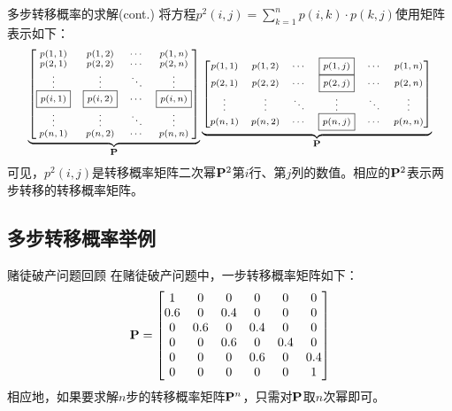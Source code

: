 \documentclass[t]{beamer}
\begin{document}
\begin{frame}{多步转移概率的求解(cont.)}
    将方程$p^2(i,j)=\displaystyle\sum_{k=1}^{n} p(i,k)\cdot p(k,j)$使用矩阵表示如下：
    \begin{equation*}\scriptsize
    \underbrace{\begin{bmatrix}
        p(1,1)&p(1,2)&\cdots &p(1,n)\\
        p(2,1)&p(2,2)&\cdots &p(2,n)\\
        \vdots&\vdots&\ddots&\vdots\\
        \boxed{p(i,1)}& \boxed{p(i,2)}&\cdots &\boxed{p(i,n)}\\
        \vdots&\vdots&\ddots&\vdots\\
        p(n,1)& p(n,2)&\cdots &p(n,n)\\
        \end{bmatrix}}_{\bf P}\underbrace{\begin{bmatrix}
        p(1,1)&p(1,2)&\cdots &\boxed{ p(1,j)}&\cdots&p(1,n)\\
        p(2,1)&p(2,2)&\cdots &\boxed{ p(2,j)}&\cdots&p(2,n)\\
        \vdots&\vdots& \ddots&\vdots&\ddots&\vdots\\
        p(n,1)&p(n,2)&\cdots &\boxed{ p(n,j)}&\cdots&p(n,n)\\
        \end{bmatrix}}_{\bf P} 
    \end{equation*}
        可见，$p^2(i,j)$是转移概率矩阵二次幂${\bf P}^2$第$i$行、第$j$列的数值。相应的${\bf P}^2$表示两步转移的转移概率矩阵。
\end{frame}

\subsection{多步转移概率举例}
\begin{frame}{赌徒破产问题回顾}
    在赌徒破产问题中，一步转移概率矩阵如下：
    \begin{equation*}
    {\bf P}=\begin{bmatrix}
     1 & 0 & 0 & 0 & 0 & 0\\
     0.6 & 0 & 0.4 & 0 & 0 & 0\\
     0 & 0.6 & 0 & 0.4 & 0 & 0\\
     0 & 0 & 0.6 & 0 & 0.4 & 0\\
     0 & 0 & 0 & 0.6 & 0 & 0.4\\
     0 & 0 & 0 & 0 & 0 & 1\\
    \end{bmatrix}
    \end{equation*}
    相应地，如果要求解$n$步的转移概率矩阵${\bf P}^n$，只需对${\bf P}$取$n$次幂即可。
\end{frame}
\end{document}
